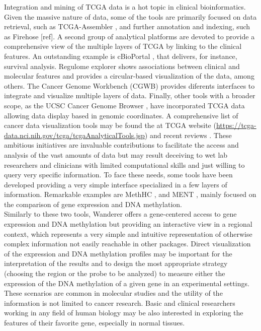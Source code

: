 \documentclass{bmcart}
\begin{document}
Integration and mining of TCGA data is a hot topic in clinical bioinformatics. Given the massive nature of data, some of the tools are primarily focused on data retrieval, such as TCGA-Assembler \cite{zhu2014tcga}, and further annotation and indexing, such as Firehose [ref]. A second group of analytical platforms are devoted to provide a comprehensive view of the multiple layers of TCGA by linking to the clinical features. An outstanding example is cBioPortal \cite{gao2013integrative}, that delivers, for instance, survival analysis. Regulome explorer \cite{cancer2012comprehensive} shows associations between clinical and molecular features and provides a circular-based visualization of the data, among others. The Cancer Genome Workbench (CGWB) \cite{zhang2010cancer} provides diferents interfaces to integrate and visualize multiple layers of data. Finally, other tools with a broader scope, as the UCSC Cancer Genome Browser \cite{kent2002human}, have incorporated TCGA data allowing data display based in genomic coordinates. A comprehensive list of cancer data visualization tools may be found the at TCGA website (\url{https://tcga-data.nci.nih.gov/tcga/tcgaAnalyticalTools.jsp}) and recent reviews \cite{plass2013mutations,schroeder2013visualizing}. These ambitious initiatives are invaluable contributions to facilitate the access and analysis of the vast amounts of data but may result deceiving to wet lab researchers and clinicians with limited computational skills and just willing to query very specific information. To face these needs, some tools have been developed providing a very simple interface specialized in a few layers of information. Remarkable examples are MethHC \cite{huang2014methhc}, and MENT \cite{baek2013ment}, mainly focused on the comparison of gene expression and DNA methylation.\\ 

Similarly to these two tools, Wanderer offers a gene-centered access to gene expression and DNA methylation but providing an interactive view in a regional context, which represents a very simple and intuitive representation of otherwise complex information not easily reachable in other packages. Direct visualization of the expression and DNA methylation profiles may be important for the interpretation of the results and to design the most appropriate strategy (choosing the region or the probe to be analyzed) to measure either the expression of the DNA methylation of a given gene in an experimental settings. These scenarios are common in molecular studies and the utility of the information is not limited to cancer research. Basic and clinical researchers working in any field of human biology may be also interested in exploring the features of their favorite gene, especially in normal tissues.\\
\end{document}
